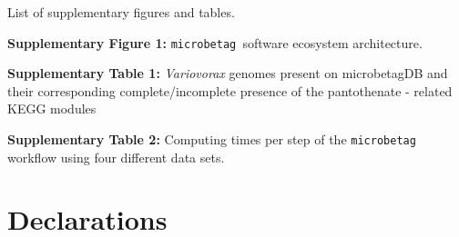 \documentclass[sn-mathphys,Numbered]{sn-jnl}  %
\theoremstyle{thmstyleone}%
\theoremstyle{thmstyletwo}%
\theoremstyle{thmstylethree}%
\newcommand{\microbetag}{\texttt{microbetag }}
\begin{document}
\backmatter



\label{supplementary-files}
    
    List of supplementary figures and tables.

    \textbf{Supplementary Figure 1:} \microbetag software ecosystem architecture.

    \textbf{Supplementary Table 1:} \textit{Variovorax} genomes present on microbetagDB and their corresponding complete/incomplete presence of the pantothenate - 
    related KEGG modules

    \textbf{Supplementary Table 2:} Computing times per step of the \microbetag workflow using four different data sets. 



\section*{Declarations}
\end{document}
